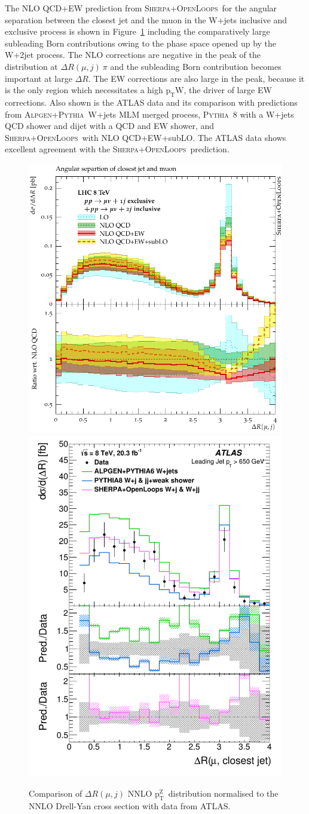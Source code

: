 \documentclass[a4paper,11pt,notoc]{article}
\newcommand{\pt}{\ensuremath{\mathrm{p_T}}}
\newcommand{\ptZ}{\ensuremath{\mathrm{p_T^{Z}}}}
\newcommand{\PYTHIA}{\textsc{Pythia}}
\newcommand{\SHERPA}{\textsc{Sherpa}}
\newcommand{\OPENLOOPS}{\textsc{OpenLoops}}
\newcommand{\ALPGEN}{\textsc{Alpgen}}
\begin{document}
The NLO QCD+EW prediction from \SHERPA+\OPENLOOPS\ for the angular separation between the closest jet and the muon in the W+jets inclusive and exclusive process is shown in Figure~\ref{fig:WinJet} including the comparatively large subleading Born contributions owing to the phase space opened up by the W+2jet process. The NLO corrections are negative in the peak of the distribution at $\Delta R(\mu,j) ~ \pi$ and the subleading Born contribution becomes important at large $\Delta R$. The EW corrections are also large in the peak, because it is the only region which necessitates a high \pt W, the driver of large EW corrections. 
Also shown is the ATLAS data and its comparison with predictions from \ALPGEN+\PYTHIA\ W+jets MLM merged process, \PYTHIA\ 8 with a W+jets QCD shower and dijet with a QCD and EW shower, and \SHERPA+\OPENLOOPS\ with NLO QCD+EW+subLO. The ATLAS data shows excellent agreement with the \SHERPA+\OPENLOOPS\ prediction. 


\begin{figure}[t!]
\centering
\includegraphics[width=0.395\columnwidth]{WinJet_dR_mu_jet_1jex2jin.pdf} 
\includegraphics[width=0.395\columnwidth]{fig_05b.pdf} 
\caption{Comparison of $\Delta R (\mu,j)$  NNLO \ptZ\ distribution normalised to the NNLO Drell-Yan cross section with data from ATLAS.}
\label{fig:WinJet}
\end{figure}   
\end{document}
